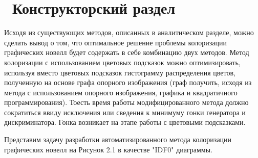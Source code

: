 \chapter{ Конструкторский раздел}
\label{cha:design}

Исходя из существующих методов, описанных в аналитическом разделе, можно сделать вывод о том, что оптимальное решение проблемы колоризации графических новелл будет содержать в себе комбинацию двух методов. Метод колоризации с использованием цветовых подсказок можно оптимизировать, используя вместо цветовых подсказок гистограмму распределения цветов, полученную на основе графа опорного изображения (граф получить, исходя из метода с использованием опорного изображения, графика и квадратичного программирования). Тоесть время работы модифицированного метода должно сократиться ввиду исключения или сведения к минимуму гонки генератора и дискриминатора. Гонка возникает на этапе работы с цветовыми подсказками. 




Представим задачу разработки автоматизированного метода колоризации  графических новелл на Рисунок 2.1 в качестве "IDF0" диаграммы.
\newpage
\begin{figure}[ht!]
\end{figure}

